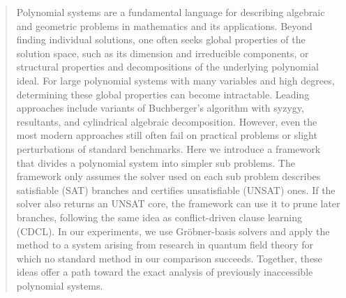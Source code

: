 \begin{abstract}

Polynomial systems are a fundamental language for describing algebraic and geometric problems in mathematics and its applications.
Beyond finding individual solutions, one often seeks global properties of the solution space, such as its dimension and irreducible components, or structural properties and decompositions of the underlying polynomial ideal.
For large polynomial systems with many variables and high degrees, determining these global properties can become intractable.
Leading approaches include variants of Buchberger's algorithm with syzygy, resultants, and cylindrical algebraic decomposition.
However, even the most modern approaches still often fail on practical problems or slight perturbations of standard benchmarks.
Here we introduce a framework that divides a polynomial system into simpler sub problems.
The framework only assumes the solver used on each sub problem describes satisfiable (SAT) branches and certifies unsatisfiable (UNSAT) ones.
If the solver also returns an UNSAT core, the framework can use it to prune later branches, following the same idea as conflict-driven clause learning (CDCL).
In our experiments, we use Gr\"obner-basis solvers and apply the method to a system arising from research in quantum field theory for which no standard method in our comparison succeeds.
Together, these ideas offer a path toward the exact analysis of previously inaccessible polynomial systems.

\end{abstract}
